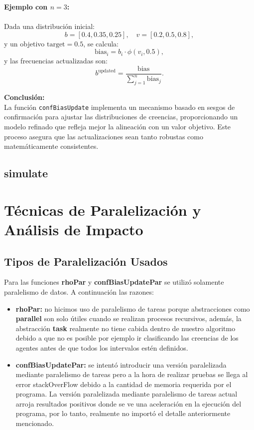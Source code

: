 \documentclass{article}
\begin{document}
	\textbf{Ejemplo con $n=3$:}\\\\
	Dada una distribución inicial:
	\[
	b = [0.4, 0.35, 0.25], \quad v = [0.2, 0.5, 0.8],
	\]
	y un objetivo $\text{target} = 0.5$, se calcula:
	\[
	\text{bias}_i = b_i \cdot \phi(v_i, 0.5),
	\]
	y las frecuencias actualizadas son:
	\[
	b^{\text{updated}} = \frac{\text{bias}}{\sum_{j=1}^n \text{bias}_j}.
	\]
	
	\textbf{Conclusión:}\\
	La función \texttt{confBiasUpdate} implementa un mecanismo basado en sesgos de confirmación para ajustar las distribuciones de creencias, proporcionando un modelo refinado que refleja mejor la alineación con un valor objetivo. Este proceso asegura que las actualizaciones sean tanto robustas como matemáticamente consistentes.



    \subsection{simulate}

  \section{Técnicas de Paralelización y Análisis de Impacto}

    \subsection{Tipos de Paralelización Usados}
    Para las funciones \textbf{rhoPar} y \textbf{confBiasUpdatePar} se utilizó solamente paralelismo de datos. A continuación  las razones:

    \begin{itemize}
      \item \textbf{rhoPar:} no hicimos uso de paralelismo de tareas porque abstracciones como \textbf{parallel} son solo útiles cuando se realizan procesos recursivos, además, la abstracción \textbf{task} realmente no tiene cabida dentro de nuestro algoritmo debido a que no es posible por ejemplo ir clasificando las creencias de los agentes antes de que todos los intervalos estén definidos.
      \item \textbf{confBiasUpdatePar:} se intentó introducir una versión paralelizada mediante paralelismo de tareas pero a la hora de realizar pruebas se llega al error stackOverFlow debido a la cantidad de memoria requerida por el programa. La versión paralelizada mediante paralelismo de tareas actual arroja resultados positivos donde se ve una aceleración en la ejecución del programa, por lo tanto, realmente no importó el detalle anteriormente mencionado.
    \end{itemize}
\end{document}
